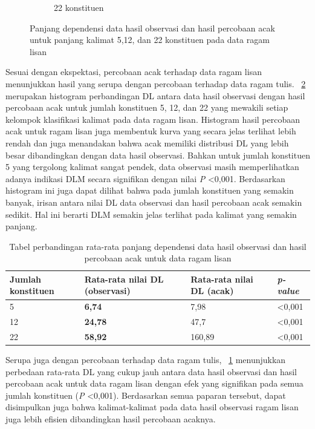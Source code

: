 \begin{figure}
\begin{subfigure}{.45\textwidth}
  \caption{22 konstituen}
  \label{fig:l22randomobs} 
\end{subfigure}

\caption{Panjang dependensi data hasil observasi dan hasil percobaan acak untuk panjang kalimat 5,12, dan 22 konstituen pada data ragam lisan}
\label{fig:lrandomobs}
\end{figure}

Sesuai dengan ekspektasi, percobaan acak terhadap data ragam lisan menunjukkan hasil yang serupa dengan percobaan terhadap data ragam tulis. \pic~\ref{fig:lrandomobs} merupakan histogram perbandingan DL antara data hasil observasi dengan hasil percobaan acak untuk jumlah konstituen 5, 12, dan 22 yang mewakili setiap kelompok klasifikasi kalimat pada data ragam lisan. Histogram hasil percobaan acak untuk ragam lisan juga membentuk kurva yang secara jelas terlihat lebih rendah dan juga menandakan bahwa  acak memiliki distribusi DL yang lebih besar dibandingkan dengan data hasil observasi. Bahkan untuk jumlah konstituen 5 yang tergolong kalimat sangat pendek, data observasi masih memperlihatkan adanya indikasi DLM secara signifikan dengan nilai \textit{P} \textless 0,001. Berdasarkan histogram ini juga dapat dilihat bahwa pada jumlah konstituen yang semakin banyak, irisan antara nilai DL data observasi dan hasil percobaan acak semakin sedikit. Hal ini berarti DLM semakin jelas terlihat pada kalimat yang semakin panjang.

\begin{table}
\begin{center}
\begin{small}
  \caption{Tabel perbandingan rata-rata panjang dependensi data hasil observasi dan hasil percobaan acak untuk data ragam lisan}  \label{tab:perbandingan_DL_lisan}
  \begin{tabular}{ | l | l | l | l |}
    \hline
	 Jumlah konstituen & Rata-rata nilai DL (observasi) & Rata-rata nilai DL (acak) & \textit{p-value} \\ \hline
	 5 & \textbf{6,74} & 7,98 & \textless 0,001 \\ \hline
	 12 & \textbf{24,78} & 47,7 & \textless 0,001 \\ \hline
	 22 & \textbf{58,92} & 160,89 & \textless 0,001 \\ \hline
  \end{tabular}
  \end{small}
\end{center}
\end{table}

Serupa juga dengan percobaan terhadap data ragam tulis, \tab~\ref{tab:perbandingan_DL_lisan} menunjukkan perbedaan rata-rata DL yang cukup jauh antara data hasil observasi dan hasil percobaan acak untuk data ragam lisan dengan efek yang signifikan pada semua jumlah konstituen (\textit{P} \textless 0,001). Berdasarkan semua paparan tersebut, dapat disimpulkan juga bahwa kalimat-kalimat pada data hasil observasi ragam lisan juga lebih efisien dibandingkan hasil percobaan acaknya.

